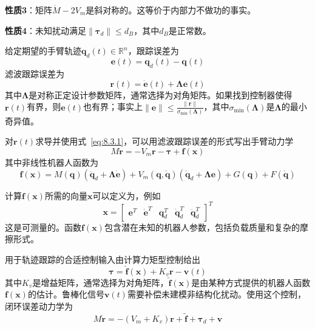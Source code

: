 \documentclass[12pt,a4paper]{ctexart}
\begin{document}
\textbf{性质3}：矩阵$\dot{M} - 2V_m$是斜对称的。这等价于内部力不做功的事实。

\textbf{性质4}：未知扰动满足$\|\bm{\tau}_d\| \leq d_B$，其中$d_B$是正常数。

给定期望的手臂轨迹$\bm{q}_d(t) \in \mathbb{R}^n$，跟踪误差为
\begin{equation}\label{eq:8.3.2}
\bm{e}(t) = \bm{q}_d(t) - \bm{q}(t)
\end{equation}
滤波跟踪误差为
\begin{equation}\label{eq:8.3.3}
\bm{r}(t) = \dot{\bm{e}}(t) + \bm{\Lambda}\bm{e}(t)
\end{equation}
其中$\bm{\Lambda}$是对称正定设计参数矩阵，通常选择为对角矩阵。如果找到控制器使得$\bm{r}(t)$有界，则$\bm{e}(t)$也有界；事实上$\|\bm{e}\| \leq \frac{\|\bm{r}\|}{\sigma_{\min}(\bm{\Lambda})}$，其中$\sigma_{\min}(\bm{\Lambda})$是$\bm{\Lambda}$的最小奇异值。

对$\bm{r}(t)$求导并使用式~\eqref{eq:8.3.1}，可以用滤波跟踪误差的形式写出手臂动力学
\begin{equation}\label{eq:8.3.4}
M\dot{\bm{r}} = -V_m\bm{r} - \bm{\tau} + \bm{f}(\bm{x})
\end{equation}
其中非线性机器人函数为
\begin{equation}\label{eq:8.3.5}
\bm{f}(\bm{x}) = M(\bm{q})\left(\ddot{\bm{q}}_d + \bm{\Lambda}\dot{\bm{e}}\right) + V_m(\bm{q},\dot{\bm{q}})\left(\dot{\bm{q}}_d + \bm{\Lambda}\bm{e}\right) + G(\bm{q}) + F(\dot{\bm{q}})
\end{equation}

计算$\bm{f}(\bm{x})$所需的向量$\bm{x}$可以定义为，例如
\begin{equation}\label{eq:8.3.6}
\bm{x} = \begin{bmatrix} \bm{e}^T & \dot{\bm{e}}^T & \bm{q}_d^T & \dot{\bm{q}}_d^T & \ddot{\bm{q}}_d^T \end{bmatrix}^T
\end{equation}
这是可测量的。函数$\bm{f}(\bm{x})$包含潜在未知的机器人参数，包括负载质量和复杂的摩擦形式。

用于轨迹跟踪的合适控制输入由计算力矩型控制给出
\begin{equation}\label{eq:8.3.7}
\bm{\tau} = \hat{\bm{f}}(\bm{x}) + K_v\bm{r} - \bm{v}(t)
\end{equation}
其中$K_v$是增益矩阵，通常选择为对角矩阵，$\hat{\bm{f}}(\bm{x})$是由某种方式提供的机器人函数$\bm{f}(\bm{x})$的估计。鲁棒化信号$\bm{v}(t)$需要补偿未建模非结构化扰动。使用这个控制，闭环误差动力学为
\begin{equation}\label{eq:8.3.8}
M\dot{\bm{r}} = -(V_m + K_v)\bm{r} + \tilde{\bm{f}} + \bm{\tau}_d + \bm{v}
\end{equation}
\end{document}
